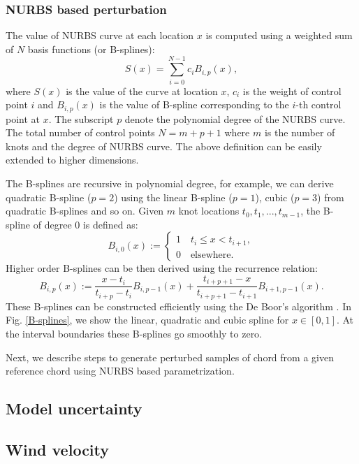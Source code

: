 \documentclass[review]{elsarticle}
\numberwithin{equation}{section}
\numberwithin{equation}{section}
\begin{document}
\subsubsection{NURBS based perturbation}
The value of NURBS curve at each location $x$ is computed using a weighted sum of $N$ basis functions (or B-splines):
\begin{equation}\label{NURB_curve}
S(x)  = \sum_{i=0}^{N-1} c_iB_{i,p}(x),
\end{equation}
where $S(x)$ is the value of the curve at location $x$, $c_i$ is the weight of control point $i$ and $B_{i,p}(x)$ is the value of B-spline corresponding to  the $i$-th control point at $x$. The subscript $p$ denote the polynomial degree of the NURBS curve. The total number of control points $N= m+p+1$ where $m$ is the number of knots  and the degree of NURBS curve. The above definition can be easily extended to higher dimensions. 

The B-splines are recursive in polynomial degree, for example, we can derive quadratic B-spline ($p=2$) using the linear B-spline ($p=1$), cubic ($p=3$) from quadratic B-splines and so on. Given $m$ knot locations $t_0,t_1,...,t_{m-1}$, the B-spline of degree 0 is defined as:
\begin{equation}\label{linearBspline}
B_{i,0}(x) :=
\begin{cases}
1\quad t_i\leq x < t_{i+1},\\
0\quad\text{elsewhere.}
\end{cases} 
\end{equation}
Higher order B-splines can be then derived using the recurrence relation\cite{deBoor}:
\begin{equation}\label{NURBS_recurrence}
B_{i,p}(x):= \frac{x-t_i}{t_{i+p} - t_i}B_{i,p-1}(x) + \frac{t_{i+p+1}  - x}{t_{i+p+1}  - t_{i+1} }B_{i+1,p-1}(x).
\end{equation}
These B-splines can be constructed efficiently using the De Boor's algorithm \cite{deBoor}.
In Fig. \ref{B-splines}, we show the linear, quadratic and cubic spline for $x\in[0,1]$. At the interval boundaries these B-splines go smoothly to zero. 

Next, we describe steps to generate perturbed samples of chord from a given reference chord using NURBS based parametrization. 


\subsection{Model uncertainty}
\subsection{Wind velocity}
\end{document}
